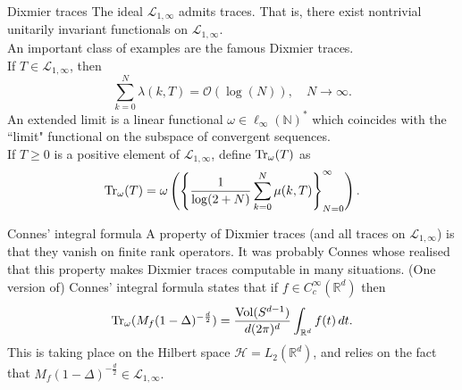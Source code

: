 \documentclass{beamer}
\numberwithin{equation}{section}
\theoremstyle{plain}
\theoremstyle{plain}
\theoremstyle{definition}
\theoremstyle{plain}
\theoremstyle{plain}
\theoremstyle{definition}
\newcommand{\tr}{{\rm Tr}}
\newcommand{\Vol}{\mathrm{Vol}}
\newcommand{\Rl}{\mathbb{R}}
\begin{document}
\begin{frame}{Dixmier traces}
    The ideal $\mathcal{L}_{1,\infty}$ admits traces. That is, there exist nontrivial unitarily invariant functionals on $\mathcal{L}_{1,\infty}$.\\
    \pause
    An important class of examples are the famous Dixmier traces.\\
    If $T \in \mathcal{L}_{1,\infty}$, then
    \begin{equation*}
        \sum_{k=0}^N \lambda(k,T) = \mathcal{O}(\log(N)),\quad N\to\infty.
    \end{equation*}
    \pause
    An extended limit is a linear functional $\omega \in \ell_{\infty}(\mathbb{N})^*$
    which coincides with the ``limit" functional on the subspace of convergent sequences.\\
    If $T \geq 0$ is a positive element of $\mathcal{L}_{1,\infty}$, define $\tr_{\omega}(T)$
    as
    $$
        \tr_\omega(T) = \omega\left(\left\{\frac{1}{\log(2+N)}\sum_{k=0}^N \mu(k,T)\right\}_{N=0}^\infty\right).
    $$
\end{frame}



\begin{frame}{Connes' integral formula}
    A property of Dixmier traces (and all traces on $\mathcal{L}_{1,\infty}$) is that they vanish on finite rank operators.
    \pause
    It was probably Connes whose realised that this property makes Dixmier traces computable in many situations. (One version of) Connes' integral formula states that
    if $f \in C^\infty_c(\Rl^d)$ then
    $$
        \tr_{\omega}(M_f(1-\Delta)^{-\frac{d}{2}}) = \frac{\Vol(S^{d-1})}{d(2\pi)^d}\int_{\Rl^d} f(t)\,dt.
    $$     
    This is taking place on the Hilbert space $\mathcal{H} = L_2(\Rl^d)$, and relies on the fact that $M_f(1-\Delta)^{-\frac{d}{2}} \in \mathcal{L}_{1,\infty}.$
\end{frame}
\end{document}

